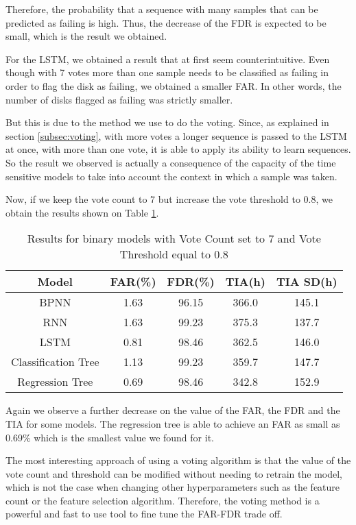 Therefore, the probability that a sequence with many samples that can be predicted as failing is high.
Thus, the decrease of the FDR is expected to be small, which is the result we obtained.

For the LSTM, we obtained a result that at first seem counterintuitive.
Even though with 7 votes more than one sample needs to be classified as failing in order to flag the disk as failing, we obtained a smaller FAR.
In other words, the number of disks flagged as failing was strictly smaller.

But this is due to the method we use to do the voting.
Since, as explained in section \ref{subsec:voting}, with more votes a longer sequence is passed to the LSTM at once, with more than one vote, it is able to apply its ability to learn sequences.
So the result we observed is actually a consequence of the capacity of the time sensitive models to take into account the context in which a sample was taken.

Now, if we keep the vote count to 7 but increase the vote threshold to 0.8, we obtain the results shown on Table \ref{table:results_binary_threshold}.

\begin{table}
  \begin{center}
    \begin{tabular}{|c|c|c|c|c|}
      \hline
    Model & FAR(\%) & FDR(\%) & TIA(h) & TIA SD(h) \\
    \hline
    BPNN & 1.63 & 96.15 & 366.0 & 145.1 \\
    RNN & 1.63 & 99.23 & 375.3 & 137.7 \\
    LSTM & 0.81 & 98.46 & 362.5 & 146.0 \\
    Classification Tree & 1.13 & 99.23 & 359.7 & 147.7 \\
    Regression Tree & 0.69 & 98.46 & 342.8 & 152.9 \\
    \hline
    \end{tabular}
    \caption[Results Binary Models with Threshold]{Results for binary models with Vote Count set to 7 and Vote Threshold equal to 0.8}
    \label{table:results_binary_threshold}
  \end{center}
\end{table}

Again we observe a further decrease on the value of the FAR, the FDR and the TIA for some models.
The regression tree is able to achieve an FAR as small as 0.69\% which is the smallest value we found for it.

The most interesting approach of using a voting algorithm is that the value of the vote count and threshold can be modified without needing to retrain the model, which is not the case when changing other hyperparameters such as the feature count or the feature selection algorithm.
Therefore, the voting method is a powerful and fast to use tool to fine tune the FAR-FDR trade off.

